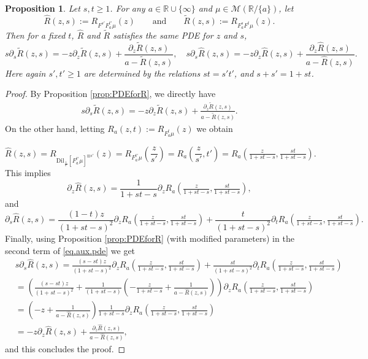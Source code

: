 \documentclass[reqno,11pt]{amsart}
\newtheorem{proposition}[theorem]{Proposition}
\theoremstyle{remark}
\newcommand{\rr}{\mathbb{R}}
\newcommand{\MM}{\mathcal{M}}
\newcommand{\dil}[1]{\mbox{Dil}_{#1}}
\newcommand{\pfreepower}[2]{F_{#1}^{#2}}
\begin{document}
\begin{proposition}
    Let $s,t\geq 1$. For any $a\in \rr\cup\{\infty\} $ and $ \mu \in \MM(\rr/\{a\}) $, let $$ \hat{R}(z,s):= R_{ F^{s'}F_a^{t'}\mu }(z) \qquad \text{and} \qquad \tilde{R}(z,s):= R_{ \pfreepower{a}{s} F^t\mu }(z) .$$ Then for a fixed $t$, $ \hat{R} $ and $\tilde{R}$ satisfies the same PDE for $z$ and $s$,
    $$ s\partial_s \tilde{R}(z,s) = -z\partial_z \tilde{R}(z,s) +\frac{ \partial_z \tilde{R}(z,s) }{ a-\tilde{R}(z,s) },\quad s\partial_s \hat{R}(z,s) = -z\partial_z \hat{R}(z,s) +\frac{ \partial_z \hat{R}(z,s) }{ a-\hat{R}(z,s) }. $$
    Here again $s',t'\geq 1$ are determined by the relations $ st=s't'$, and $ s+s'=1+st $.
\end{proposition}

\begin{proof}
By Proposition \ref{prop:PDEforR}, we directly have
\begin{align*}
    s\partial_s \tilde{R}(z,s) = -z\partial_z \tilde{R}(z,s) +\frac{ \partial_z \tilde{R}(z,s) }{ a-\tilde{R}(z,s) }.
\end{align*}
On the other hand, letting $ R_a(z,t):= R_{ \pfreepower{a}{t}\mu }(z) $ we obtain

$$
\hat{R}(z,s)= R_{\dil{\frac{1}{s'}}[F_a^{t'}\mu ]^{\boxplus s'} }(z) = R_{ F_a^{t'}\mu }\left( \frac{z}{s'} \right) = R_a\left( \frac{z}{s'},t' \right) = R_a\left( \tfrac{z}{1+st-s},\tfrac{st}{1+st-s} \right).
$$
This implies 
$$ \partial_z \hat{R}(z,s) = \frac{1}{1+st-s}\partial_zR_a\left( \tfrac{z}{1+st-s},\tfrac{st}{1+st-s} \right), $$
and
\begin{equation}
\label{eq.aux.pde}    
    \partial_s \hat{R}(z,s) = \frac{(1-t)z}{(1+st-s)^2}\partial_zR_a\left( \tfrac{z}{1+st-s},\tfrac{st}{1+st-s} \right)+ \frac{ t}{ (1+st-s)^2} \partial_tR_a\left( \tfrac{z}{1+st-s},\tfrac{st}{1+st-s} \right).
\end{equation}
Finally, using Proposition \ref{prop:PDEforR} (with modified parameters) in the second term of \eqref{eq.aux.pde} we get
\begin{align*}
    & s\partial_s \hat{R}(z,s) = \frac{(s-st)z}{(1+st-s)^2}\partial_zR_a\left( \tfrac{z}{1+st-s},\tfrac{st}{1+st-s} \right)+ \frac{st}{ (1+st-s)^2} \partial_tR_a\left( \tfrac{z}{1+st-s},\tfrac{st}{1+st-s} \right)\\
    &=\left(\tfrac{(s-st)z}{(1+st-s)^2} +\tfrac{1}{ (1+st-s)}\left( -\tfrac{z}{1+st-s}+ \tfrac{1}{a-\hat{R}(z,s)} \right) \right)\partial_zR_a\left( \tfrac{z}{1+st-s},\tfrac{st}{1+st-s} \right)\\
    &= \left( -z +\frac{1}{a-\hat{R}(z,s)} \right) \frac{ 1 }{1+st-s}\partial_zR_a\left( \tfrac{z}{1+st-s},\tfrac{st}{1+st-s} \right)\\
    &=-z\partial_z \hat{R}(z,s) +\frac{ \partial_z \hat{R}(z,s) }{ a-\hat{R}(z,s) },
\end{align*}
and this concludes the proof.
\end{proof}
\end{document}
